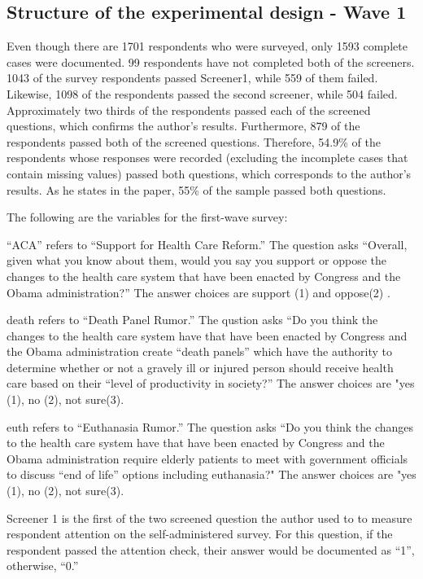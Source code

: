 \documentclass[AER]{AEA}
\begin{document}
\subsection{Structure of the experimental design  - Wave 1}

Even though there are 1701 respondents who were surveyed, only 1593
complete cases were documented. 99 respondents have not completed both
of the screeners. 1043 of the survey respondents passed Screener1, while
559 of them failed. Likewise, 1098 of the respondents passed the second
screener, while 504 failed. Approximately two thirds of the respondents
passed each of the screened questions, which confirms the author's
results. Furthermore, 879 of the respondents passed both of the screened
questions. Therefore, 54.9\% of the respondents whose responses were
recorded (excluding the incomplete cases that contain missing values)
passed both questions, which corresponds to the author's results. As he
states in the paper, 55\% of the sample passed both questions.

The following are the variables for the first-wave survey:

``ACA'' refers to ``Support for Health Care Reform.'' The question asks
``Overall, given what you know about them, would you say you support or
oppose the changes to the health care system that have been enacted by
Congress and the Obama administration?'' The answer choices are support
(1) and oppose(2) .

death refers to ``Death Panel Rumor.'' The qustion asks ``Do you think
the changes to the health care system have that have been enacted by
Congress and the Obama administration create ``death panels'' which have
the authority to determine whether or not a gravely ill or injured
person should receive health care based on their ``level of productivity
in society?'' The answer choices are "yes (1), no (2), not sure(3).

euth refers to ``Euthanasia Rumor.'' The question asks ``Do you think
the changes to the health care system have that have been enacted by
Congress and the Obama administration require elderly patients to meet
with government officials to discuss ``end of life'' options including
euthanasia?" The answer choices are "yes (1), no (2), not sure(3).

Screener 1 is the first of the two screened question the author used to
to measure respondent attention on the self-administered survey. For
this question, if the respondent passed the attention check, their
answer would be documented as ``1'', otherwise, ``0.''
\end{document}
